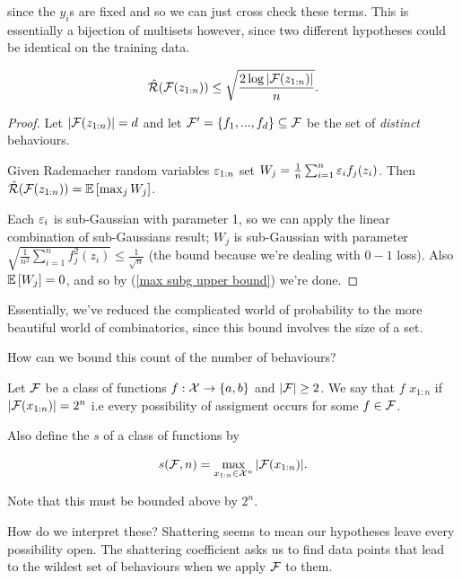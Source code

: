 \documentclass[11pt]{scrartcl}
\begin{document}
since the $y_i$s are fixed and so we can just cross check these terms. This is essentially a bijection of multisets however, since two different hypotheses could be identical on the training data. %

\begin{theorem}
\label{empirical rad to combi}
\begin{equation}
\hat{\mathcal{R}}(\mathcal{F}(z_{1:n})) \le \sqrt{ \frac{2 \log |\mathcal{F}(z_{1:n})|}{n} }.
\end{equation}

\begin{proof} %
Let $| \mathcal{F}(z_{1:n}) | = d$ and let $\mathcal{F}' = \{f_1, ... , f_d\} \subseteq \mathcal{F}$ be the set of \textit{distinct} behaviours.

Given Rademacher random variables $\varepsilon_{1:n}$ set $W_j = \frac1n \sum_{i=1}^n \varepsilon_i f_j(z_i)$. Then $\hat{\mathcal{R}}(\mathcal{F}(z_{1:n})) = \mathbb{E} \left[ \max_j W_j \right]$.

Each $\varepsilon_i$ is sub-Gaussian with parameter 1, so we can apply the linear combination of sub-Gaussians result; $W_j$ is sub-Gaussian with parameter $\sqrt{\frac{1}{n^2} \sum_{i=1}^n f_j^2(z_i)}\le \frac{1}{\sqrt{n}}$ (the bound because we're dealing with $0-1$ loss). Also $\mathbb{E} \left[ W_j \right] = 0$, and so by (\ref{max subg upper bound}) we're done.
\end{proof}
\end{theorem}

Essentially, we've reduced the complicated world of probability to the more beautiful world of combinatorics, since this bound involves the size of a set.

How can we bound this count of the number of behaviours?

\begin{definition}
Let $\mathcal{F}$ be a class of functions $f:\mathcal{X} \rightarrow \{ a,b \}$ and $|\mathcal{F}| \ge 2$. We say that $f$  $x_{1:n}$ if $|\mathcal{F}(x_{1:n})| = 2^n$ i.e every possibility of assigment occurs for some $f \in \mathcal{F}$. 

Also define the  $s$ of a class of functions by

\begin{equation}
s(\mathcal{F}, n) = \max_{x_{1:n} \in \mathcal{X}^n} |\mathcal{F}(x_{1:n})|.
\end{equation}

Note that this must be bounded above by $2^n$. 

How do we interpret these? Shattering seems to mean our hypotheses leave every possibility open. The shattering coefficient asks us to find data points that lead to the wildest set of behaviours when we apply $\mathcal{F}$ to them.
\end{definition}
\end{document}

